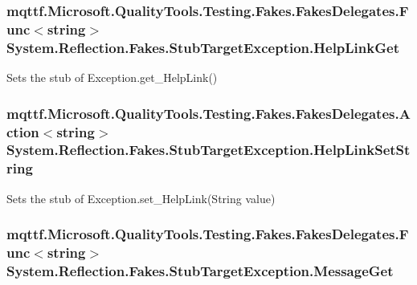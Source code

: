 \hypertarget{class_system_1_1_reflection_1_1_fakes_1_1_stub_target_exception_a931d7438a377bed037d9834318b0043f}{
\subsubsection[{Help\-Link\-Get}]{\setlength{\rightskip}{0pt plus 5cm}mqttf.\-Microsoft.\-Quality\-Tools.\-Testing.\-Fakes.\-Fakes\-Delegates.\-Func$<$string$>$ System.\-Reflection.\-Fakes.\-Stub\-Target\-Exception.\-Help\-Link\-Get}}\label{class_system_1_1_reflection_1_1_fakes_1_1_stub_target_exception_a931d7438a377bed037d9834318b0043f}


Sets the stub of Exception.\-get\-\_\-\-Help\-Link()

\hypertarget{class_system_1_1_reflection_1_1_fakes_1_1_stub_target_exception_ae0e7bdb51b8bc2245cf3fd77cbdba11b}{
\subsubsection[{Help\-Link\-Set\-String}]{\setlength{\rightskip}{0pt plus 5cm}mqttf.\-Microsoft.\-Quality\-Tools.\-Testing.\-Fakes.\-Fakes\-Delegates.\-Action$<$string$>$ System.\-Reflection.\-Fakes.\-Stub\-Target\-Exception.\-Help\-Link\-Set\-String}}\label{class_system_1_1_reflection_1_1_fakes_1_1_stub_target_exception_ae0e7bdb51b8bc2245cf3fd77cbdba11b}


Sets the stub of Exception.\-set\-\_\-\-Help\-Link(\-String value)

\hypertarget{class_system_1_1_reflection_1_1_fakes_1_1_stub_target_exception_a95a40a59f6f831f5f927f6ccc9372650}{
\subsubsection[{Message\-Get}]{\setlength{\rightskip}{0pt plus 5cm}mqttf.\-Microsoft.\-Quality\-Tools.\-Testing.\-Fakes.\-Fakes\-Delegates.\-Func$<$string$>$ System.\-Reflection.\-Fakes.\-Stub\-Target\-Exception.\-Message\-Get}}\label{class_system_1_1_reflection_1_1_fakes_1_1_stub_target_exception_a95a40a59f6f831f5f927f6ccc9372650}



